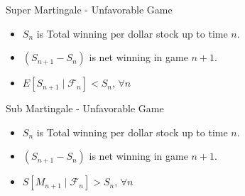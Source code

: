 Super Martingale - Unfavorable Game\\
\begin{itemize}
\item $S_{n}$ is Total winning per dollar stock up to time $n$.
\item $\left( S_{n+1} - S_{n}\right) $ is net winning in game $n+1$.
\item $E[ S_{n+1}\mid \mathcal{F}_{n}] < S_{n}$, $\forall n$
\end{itemize}

Sub Martingale - Unfavorable Game\\
\begin{itemize}
\item $S_{n}$ is Total winning per dollar stock up to time $n$.
\item $\left( S_{n+1} - S_{n}\right) $ is net winning in game $n+1$.
\item $S[ M_{n+1}\mid \mathcal{F}_{n}] > S_{n}$, $\forall n$
\end{itemize}
